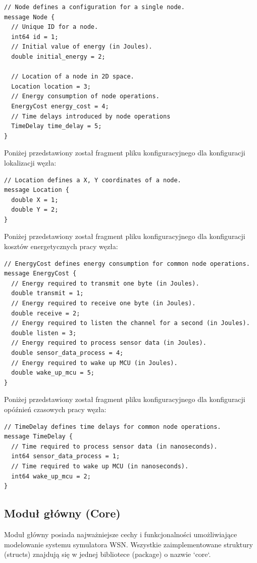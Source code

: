 \documentclass[a4paper,12pt,twoside,openany]{report}
\begin{document}
\begin{lstlisting}
// Node defines a configuration for a single node.
message Node {
  // Unique ID for a node.
  int64 id = 1;
  // Initial value of energy (in Joules). 
  double initial_energy = 2;

  // Location of a node in 2D space.
  Location location = 3;
  // Energy consumption of node operations.
  EnergyCost energy_cost = 4;
  // Time delays introduced by node operations
  TimeDelay time_delay = 5;
}
\end{lstlisting}

Poniżej przedstawiony został fragment pliku konfiguracyjnego dla konfiguracji lokalizacji węzła:

\begin{lstlisting}
// Location defines a X, Y coordinates of a node.
message Location {
  double X = 1;
  double Y = 2;
}
\end{lstlisting}

Poniżej przedstawiony został fragment pliku konfiguracyjnego dla konfiguracji kosztów energetycznych pracy węzła:

\begin{lstlisting}
// EnergyCost defines energy consumption for common node operations.
message EnergyCost {
  // Energy required to transmit one byte (in Joules).
  double transmit = 1;
  // Energy required to receive one byte (in Joules).
  double receive = 2;
  // Energy required to listen the channel for a second (in Joules).
  double listen = 3;
  // Energy required to process sensor data (in Joules).
  double sensor_data_process = 4;
  // Energy required to wake up MCU (in Joules).
  double wake_up_mcu = 5;
}
\end{lstlisting}

Poniżej przedstawiony został fragment pliku konfiguracyjnego dla konfiguracji opóźnień czasowych pracy węzła:

\begin{lstlisting}
// TimeDelay defines time delays for common node operations.
message TimeDelay {
  // Time required to process sensor data (in nanoseconds).
  int64 sensor_data_process = 1;
  // Time required to wake up MCU (in nanoseconds).
  int64 wake_up_mcu = 2;
}
\end{lstlisting}

\subsection{Moduł główny (Core)}

Moduł główny posiada najważniejsze cechy i funkcjonalności umożliwiające modelowanie systemu symulatora WSN.
Wszystkie zaimplementowane struktury (structs) znajdują się w jednej bibliotece (package) o nazwie `core`.
\end{document}
